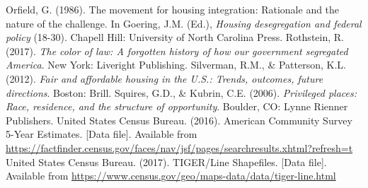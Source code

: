 \documentclass[paper=letter, fontsize=12pt]{scrartcl} %
\begin{document}
\begin{thebibliography}{9}
Orfield, G. (1986). The movement for housing integration: Rationale and the nature of the challenge. In Goering, J.M. (Ed.), \textit{Housing desegregation and federal policy} (18-30). Chapell Hill: University of North Carolina Press. 
Rothstein, R. (2017). \textit{The color of law: A forgotten history of how our government segregated America}. New York: Liveright Publishing.
Silverman, R.M., \& Patterson, K.L. (2012). \textit{Fair and affordable housing in the U.S.: Trends, outcomes, future directions}. Boston: Brill.
Squires, G.D., \& Kubrin, C.E. (2006). \textit{Privileged places: Race, residence, and the structure of opportunity}. Boulder, CO: Lynne Rienner Publishers.
United States Census Bureau. (2016). American Community Survey 5-Year Estimates. [Data file]. Available from \href{https://factfinder.census.gov/faces/nav/jsf/pages/searchresults.xhtml?refresh=t}{https://factfinder.census.gov/faces/nav/jsf/pages/searchresults.xhtml?refresh=t}
United States Census Bureau. (2017). TIGER/Line Shapefiles. [Data file]. Available from \href{https://www.census.gov/geo/maps-data/data/tiger-line.html}{https://www.census.gov/geo/maps-data/data/tiger-line.html}
\end{thebibliography}
\end{document}
